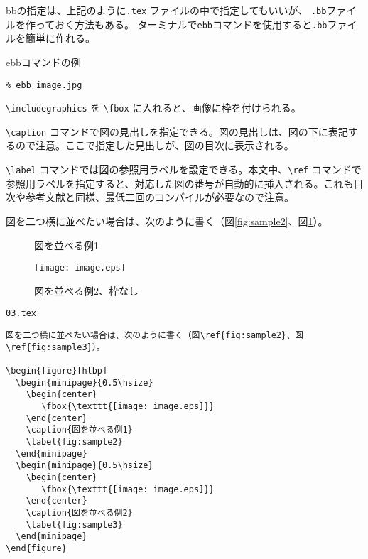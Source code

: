 bbの指定は、上記のように{\tt *.tex} ファイルの中で指定してもいいが、
{\tt *.bb}ファイルを作っておく方法もある。
ターミナルで{\tt ebb}コマンドを使用すると{\tt *.bb}ファイルを簡単に作れる。


\begin{itembox}[l]{ebbコマンドの例}
\begin{verbatim}
% ebb image.jpg
\end{verbatim}
\end{itembox}


\verb|\includegraphics| を \verb|\fbox| に入れると、画像に枠を付けられる。

\verb|\caption| コマンドで図の見出しを指定できる。図の見出しは、図の下に表記するので注意。ここで指定した見出しが、図の目次に表示される。

\verb|\label| コマンドでは図の参照用ラベルを設定できる。本文中、\verb|\ref| コマンドで参照用ラベルを指定すると、対応した図の番号が自動的に挿入される。これも目次や参考文献と同様、最低二回のコンパイルが必要なので注意。

図を二つ横に並べたい場合は、次のように書く（図\ref{fig:sample2}、図\ref{fig:sample3}）。

\begin{figure}[htbp]
  \begin{minipage}{0.5\hsize}
    \begin{center}
    \end{center}
    \caption{図を並べる例1}
    \label{fig:sample2}
  \end{minipage}
  \begin{minipage}{0.5\hsize}
    \begin{center}
       \texttt{[image: image.eps]}
    \end{center}
    \caption{図を並べる例2、枠なし}
    \label{fig:sample3}
  \end{minipage}
\end{figure}

\begin{itembox}[l]{{\tt 03.tex}}
\begin{verbatim}
図を二つ横に並べたい場合は、次のように書く（図\ref{fig:sample2}、図\ref{fig:sample3}）。

\begin{figure}[htbp]
  \begin{minipage}{0.5\hsize}
    \begin{center}
       \fbox{\texttt{[image: image.eps]}}
    \end{center}
    \caption{図を並べる例1}
    \label{fig:sample2}
  \end{minipage}
  \begin{minipage}{0.5\hsize}
    \begin{center}
       \fbox{\texttt{[image: image.eps]}}
    \end{center}
    \caption{図を並べる例2}
    \label{fig:sample3}
  \end{minipage}
\end{figure}
\end{verbatim}
\end{itembox}


